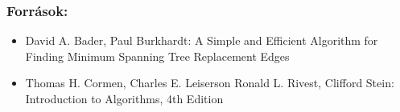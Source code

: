 \begin{frame}
\frametitle{Források:}

\begin{itemize}
  \item David A. Bader, Paul Burkhardt: A Simple and Efficient Algorithm for Finding Minimum Spanning Tree Replacement Edges
  \item Thomas H. Cormen, Charles E. Leiserson Ronald L. Rivest, Clifford Stein: Introduction to Algorithms, 4th Edition
\end{itemize}
  
\end{frame}
